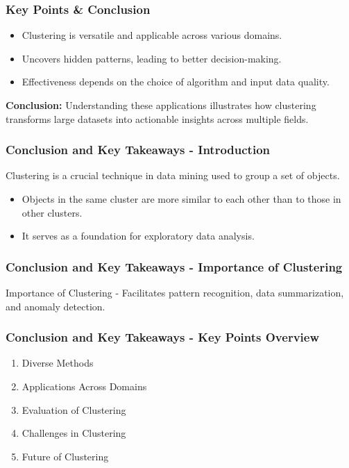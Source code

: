 \documentclass{beamer}
\begin{document}
\begin{frame}[fragile]
    \frametitle{Key Points \& Conclusion}
    \begin{itemize}
        \item Clustering is versatile and applicable across various domains.
        \item Uncovers hidden patterns, leading to better decision-making.
        \item Effectiveness depends on the choice of algorithm and input data quality.
    \end{itemize}

    \textbf{Conclusion:} Understanding these applications illustrates how clustering transforms large datasets into actionable insights across multiple fields.
\end{frame}

\begin{frame}[fragile]
    \frametitle{Conclusion and Key Takeaways - Introduction}
    Clustering is a crucial technique in data mining used to group a set of objects. 
    \begin{itemize}
        \item Objects in the same cluster are more similar to each other than to those in other clusters.
        \item It serves as a foundation for exploratory data analysis.
    \end{itemize}
\end{frame}

\begin{frame}[fragile]
    \frametitle{Conclusion and Key Takeaways - Importance of Clustering}
    \begin{block}{Importance of Clustering}
        - Facilitates pattern recognition, data summarization, and anomaly detection.
    \end{block}
\end{frame}

\begin{frame}[fragile]
    \frametitle{Conclusion and Key Takeaways - Key Points Overview}
    \begin{enumerate}
        \item Diverse Methods
        \item Applications Across Domains
        \item Evaluation of Clustering
        \item Challenges in Clustering
        \item Future of Clustering
    \end{enumerate}
\end{frame}
\end{document}
